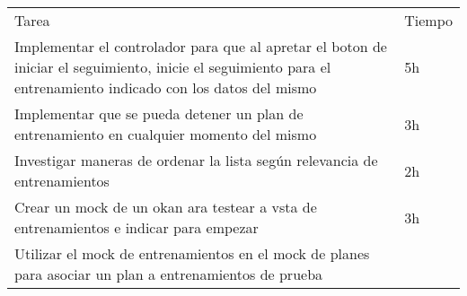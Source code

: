 \begin{enumerate}
  \begin{longtable}[c]{@{}ll@{}}
  \hline\noalign{\medskip}
  \begin{minipage}[b]{0.92\columnwidth}\raggedright
  Tarea
  \end{minipage} & \begin{minipage}[b]{0.08\columnwidth}\raggedright
  Tiempo
  \end{minipage}
  \\\noalign{\medskip}
  \hline\noalign{\medskip}
  \begin{minipage}[t]{0.92\columnwidth}\raggedright
  Implementar el controlador para que al apretar el boton de iniciar el
  seguimiento, inicie el seguimiento para el entrenamiento indicado con
  los datos del mismo
  \end{minipage} & \begin{minipage}[t]{0.08\columnwidth}\raggedright
  5h
  \end{minipage}
  \\\noalign{\medskip}
  \begin{minipage}[t]{0.92\columnwidth}\raggedright
  Implementar que se pueda detener un plan de entrenamiento en cualquier
  momento del mismo
  \end{minipage} & \begin{minipage}[t]{0.08\columnwidth}\raggedright
  3h
  \end{minipage}
  \\\noalign{\medskip}
  \begin{minipage}[t]{0.92\columnwidth}\raggedright
  Investigar maneras de ordenar la lista según relevancia de
  entrenamientos
  \end{minipage} & \begin{minipage}[t]{0.08\columnwidth}\raggedright
  2h
  \end{minipage}
  \\\noalign{\medskip}
  \begin{minipage}[t]{0.92\columnwidth}\raggedright
  Crear un mock de un okan ara testear a vsta de entrenamientos e
  indicar para empezar
  \end{minipage} & \begin{minipage}[t]{0.08\columnwidth}\raggedright
  3h
  \end{minipage}
  \\\noalign{\medskip}
  \begin{minipage}[t]{0.92\columnwidth}\raggedright
  Utilizar el mock de entrenamientos en el mock de planes para asociar
  un plan a entrenamientos de prueba
  \end{minipage} & \begin{minipage}[t]{0.08\columnwidth}\raggedright

\end{minipage}
\end{longtable}
\end{enumerate}
